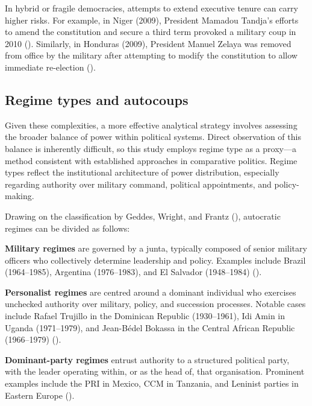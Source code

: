 \documentclass[
  12pt,
]{report}
\begin{document}
In hybrid or fragile democracies, attempts to extend executive tenure
can carry higher risks. For example, in Niger (2009), President Mamadou
Tandja's efforts to amend the constitution and secure a third term
provoked a military coup in 2010 (). Similarly, in Honduras (2009), President Manuel Zelaya was
removed from office by the military after attempting to modify the
constitution to allow immediate re-election
().

\subsection*{Regime types and
autocoups}\label{regime-types-and-autocoups}

Given these complexities, a more effective analytical strategy involves
assessing the broader balance of power within political systems. Direct
observation of this balance is inherently difficult, so this study
employs regime type as a proxy---a method consistent with established
approaches in comparative politics. Regime types reflect the
institutional architecture of power distribution, especially regarding
authority over military command, political appointments, and
policy-making.

Drawing on the classification by Geddes, Wright, and Frantz
(), autocratic regimes can be divided as
follows:

\textbf{Military regimes} are governed by a junta, typically composed of
senior military officers who collectively determine leadership and
policy. Examples include Brazil (1964--1985), Argentina (1976--1983),
and El Salvador (1948--1984) ().

\textbf{Personalist regimes} are centred around a dominant individual
who exercises unchecked authority over military, policy, and succession
processes. Notable cases include Rafael Trujillo in the Dominican
Republic (1930--1961), Idi Amin in Uganda (1971--1979), and Jean-Bédel
Bokassa in the Central African Republic (1966--1979)
().

\textbf{Dominant-party regimes} entrust authority to a structured
political party, with the leader operating within, or as the head of,
that organisation. Prominent examples include the PRI in Mexico, CCM in
Tanzania, and Leninist parties in Eastern Europe
().
\end{document}
